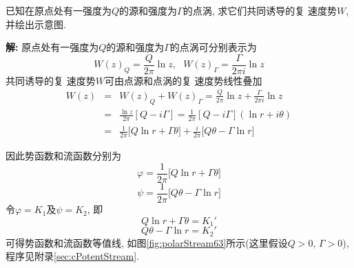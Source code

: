 \begin{problem}[问题6.3]
已知在原点处有一强度为$Q$的源和强度为$\Gamma$的点涡, 求它们共同诱导的复
速度势$W$, 并绘出示意图.
\end{problem}

\begin{solution}
\textbf{解:} 原点处有一强度为$Q$的源和强度为$\Gamma$的点涡可分别表示为
\[
W(z)_Q = \frac{Q}{2\pi}\ln z, {~~~} W(z)_\Gamma = \frac{\Gamma}{2\pi i}\ln z
\]
共同诱导的复
速度势$W$可由点源和点涡的复
速度势线性叠加
\begin{eqnarray}
W(z)&=& W(z)_Q + W(z)_\Gamma = \frac{Q}{2\pi}\ln z + \frac{\Gamma}{2\pi i}\ln z\nonumber\\
&=& \frac{\ln z}{2\pi}[Q-i\Gamma]=\frac{1}{2\pi}[Q-i\Gamma](\ln r + i\theta)\nonumber\\
&=& \frac{1}{2\pi}\Big[Q\ln r + \Gamma\theta \Big] + \frac{i}{2\pi}\Big[Q\theta-\Gamma\ln r\Big]\nonumber
\end{eqnarray}
\vspace{-1em}

\begin{multicols}{2}
\noindent 因此势函数和流函数分别为
\[
\varphi = \frac{1}{2\pi}\Big[Q\ln r + \Gamma\theta \Big]
\]
\[
\psi = \frac{1}{2\pi}\Big[Q\theta-\Gamma\ln r\Big]
\]
令$\varphi=K_1$及$\psi=K_2$, 即
\[
Q\ln r + \Gamma\theta = K_1'
\]
\[
Q\theta-\Gamma\ln r = K_2'
\]
可得势函数和流函数等值线, 如图\ref{fig:polarStream63}所示(这里假设$Q>0$, $\Gamma>0$), 程序见附录\ref{sec:cPotentStream}.

\begin{center}

\label{fig:polarStream63}
\end{center}
\end{multicols}

\end{solution} 
